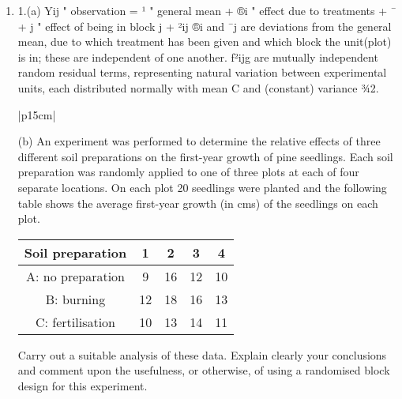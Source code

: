 \documentclass[a4paper,12pt]{article}
\begin{document}
\begin{enumerate}
\item 1.(a) Yij
"
observation
= ¹
"
general mean
+ ®i
"
effect
due to
treatments
+ ¯ + j
"
effect of
being in
block j
+ ²ij
®i and ¯j are deviations from the general mean, due to which treatment has been given and
which block the unit(plot) is in; these are independent of one another.
f²ijg are mutually independent random residual terms, representing natural variation between
experimental units, each distributed normally with mean C and (constant) variance ¾2.

\begin{table}[ht!]
 
\centering
 
\begin{tabular}{|p{15cm}|}
 
\hline  
\large

(b) An experiment was performed to determine the relative effects of three different soil preparations on the first-year growth of pine seedlings.  Each soil preparation was randomly applied to one of three plots at each of four separate locations.  On each plot 20 seedlings were planted and the following table shows the average first-year growth (in cms) of the seedlings on each plot.

\begin{center}
\begin{tabular}{|c|c|c|c|c|}\hline
Soil preparation  &      1 &         2  &       3&  4 \\ \hline \hline
A: no preparation  &      9     &    16   &    12 &  10 \\ \hline
B: burning  &    12     &   18    &  16 & 13 \\ \hline
C: fertilisation  &    10    &    13  &    14 & 11  \\ \hline
\end{tabular}
\end{center}

Carry out a suitable analysis of these data.  Explain clearly your conclusions and comment upon the usefulness, or otherwise, of using a randomised block design for this experiment.

\\ \hline
  
\end{tabular}

\end{table}


\end{enumerate}
\end{document}
